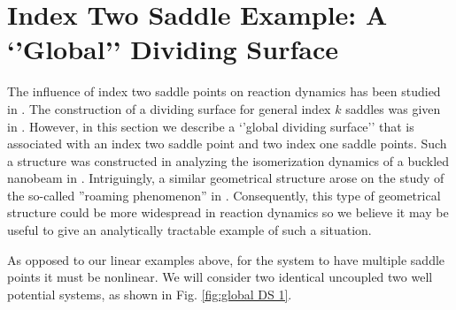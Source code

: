 \documentclass{article}
\begin{document}











\section*{Index Two Saddle Example: A `'Global'' Dividing Surface}


The influence of index two saddle points on reaction dynamics has been studied in \cite{ezra2009phase,collins:244105,Haller10,Mauguiere13}. The construction of a dividing surface for general index $k$ saddles was given in \cite{collins:244105}.  However, in this section we describe a `'global dividing surface'' that is associated with an index two saddle point and two index one saddle points. Such a structure was constructed in analyzing the isomerization dynamics of a buckled nanobeam in \cite{collins2012isomerization}. Intriguingly, a similar geometrical structure arose on the study of the so-called ''roaming phenomenon'' in \cite{Harding_et_al_2012, suits14}. Consequently, this type of geometrical structure could be more widespread in reaction dynamics so we believe it may be useful to give an analytically tractable example of such a situation.

As opposed to our linear examples above,  for the system to have multiple saddle points it must be  nonlinear.  We will consider two identical uncoupled two well potential systems, as shown in Fig. \ref{fig:global DS 1}.
\end{document}
